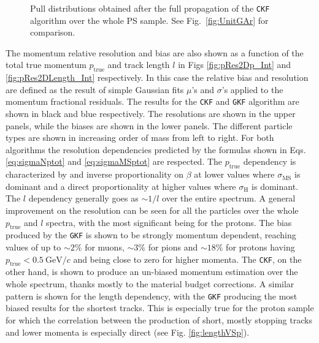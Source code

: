\begin{figure}[t]
\begin{subfigure}{0.32\textwidth}
         \caption{}
         \label{fig:tanlambdaBiasVSp2212_Int}
     \end{subfigure}
        \caption{Pull distributions obtained after the full propagation of the \texttt{CKF} algorithm over the whole PS sample. See Fig.~\ref{fig:UnitGAr} for comparison.}
        \label{fig:tanlambdaRes2Dp_Int}
\end{figure}


The momentum relative resolution and bias are also shown as a function of the total true momentum $p_\textrm{true}$ and track length $l$ in Figs \ref{fig:pRes2Dp_Int} and \ref{fig:pRes2DLength_Int} respectively. In this case the relative bias and resolution are defined as the result of simple Gaussian fits $\mu$'s and $\sigma$'s applied to the momentum fractional residuals. The results for the \texttt{CKF} and \texttt{GKF} algorithm are shown in black and blue respectively. The resolutions are shown in the upper panels, while the biases are shown in the lower panels. The different particle types are shown in increasing order of mass from left to right. For both algorithms the resolution dependencies predicted by the formulas shown in Eqs. \ref{eq:sigmaNptot} and \ref{eq:sigmaMSptot} are respected. The $p_\textrm{true}$ dependency is characterized by and inverse proportionality on $\beta$ at lower values where $\sigma_\textrm{MS}$ is dominant and a direct proportionality at higher values where $\sigma_\textrm{H}$ is dominant. The $l$ dependency generally goes as $\sim 1/l$ over the entire spectrum. A general improvement on the resolution can be seen for all the particles over the whole $p_\textrm{true}$ and $l$ spectra, with the most significant being for the protons. The bias produced by the \texttt{GKF} is shown to be strongly momentum dependent, reaching values of up to $\sim 2\%$ for muons, $\sim 3\%$ for pions and $\sim 18\%$ for protons having $p_\textrm{true}<0.5 \ \textrm{GeV}/c$ and being close to zero for higher momenta. The \texttt{CKF}, on the other hand, is shown to produce an un-biased momentum estimation over the whole spectrum, thanks mostly to the material budget corrections. A similar pattern is shown for the length dependency, with the \texttt{GKF} producing the most biased results for the shortest tracks. This is especially true for the proton sample for which the correlation between the production of short, mostly stopping tracks and lower momenta is especially direct (see Fig. \ref{fig:lengthVSp}).

